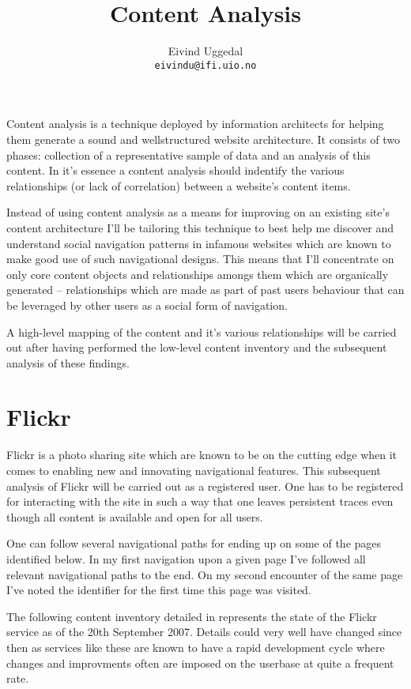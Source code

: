 \documentclass[12pt,a4paper]{article}
\title{Content Analysis}
\author{Eivind Uggedal\\
        \texttt{eivindu@ifi.uio.no}}
\date{}
\begin{document}
\maketitle{}

Content analysis is a technique deployed by information architects for helping
them generate a sound and wellstructured website architecture. It consists of
two phases: collection of a representative sample of data and an analysis of
this content. In it's essence a content analysis should indentify the various
relationships (or lack of correlation) between a website's content items.

Instead of using content analysis as a means for improving on an existing
site's content architecture I'll be tailoring this technique to best help me
discover and understand social navigation patterns in infamous websites which
are known to make good use of such navigational designs. This means that I'll
concentrate on only core content objects and relationships amongs them
which are organically generated -- relationships which are made as part of
past users behaviour that can be leveraged by other users as a social form
of navigation.

A high-level mapping of the content and it's various relationships
will be carried out after having performed the low-level content inventory
and the subsequent analysis of these findings.

\section{Flickr}

Flickr is a photo sharing site which are known to be on the cutting edge when
it comes to enabling new and innovating navigational features. This subsequent
analysis of Flickr will be carried out as a registered user. One has to be
registered for interacting with the site in such a way that one leaves
persistent traces even though all content is available and open for all users.

One can follow several navigational paths for ending up on some of the pages
identified below. In my first navigation upon a given page I've followed all
relevant navigational paths to the end. On my second encounter of the same
page I've noted the identifier for the first time this page was visited.

The following content inventory detailed in
represents the state of the Flickr service as of the 20th September 2007.
Details could very well have changed since then as
services like these are known to have a rapid development cycle
where changes and improvments often are imposed on the userbase at quite
a frequent rate.
\end{document}
